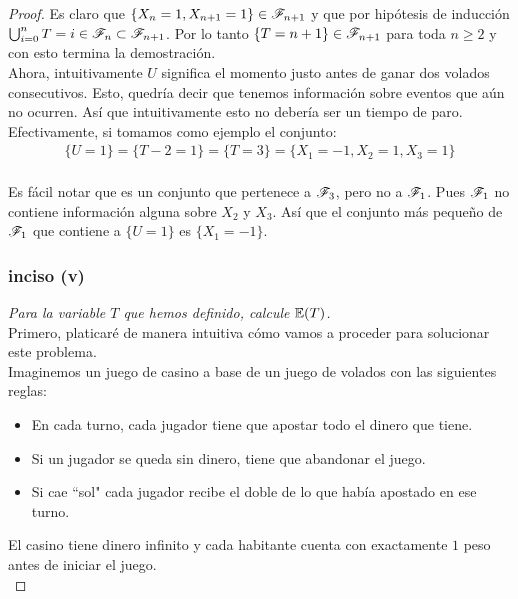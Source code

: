 \begin{proof}
			Es claro que $\{ X_n = 1, X_{n+1} = 1\} \in \mathscr{F}_{n + 1}$ y que por hipótesis de inducción
			$\bigcup_{i=0}^{n} {T = i} \in \mathscr{F}_n \subset \mathscr{F}_{n + 1}$. Por lo tanto
			$\{T = n + 1 \} \in \mathscr{F}_{n+1}$ para toda $n \geq 2$ y con esto termina la demostración.\\
			
		Ahora, intuitivamente $U$ significa el momento justo antes de ganar dos volados consecutivos.
		Esto, quedría decir que tenemos información sobre eventos que aún no ocurren. Así que intuitivamente
		esto no debería ser un tiempo de paro.\\
		
		Efectivamente, si tomamos como ejemplo el conjunto: 
			\begin{align}
				\{ U = 1 \} = \{ T - 2 = 1\} = \{ T = 3\} = \{X_1 = -1, X_2 = 1, X_3 = 1\}
			\end{align}		\\
				
		Es fácil notar que es un conjunto que pertenece a $\mathscr{F}_3$, pero no a $\mathscr{F}_1$. Pues $\mathscr{F}_1$
		no contiene información alguna sobre $X_2$ y $X_3$. Así que el conjunto más pequeño de $\mathscr{F}_1$ 
		que contiene a $\{ U = 1 \}$ es $\{ X_1 = -1 \}$.\\
	
	\subsubsection{inciso (v)}	
	\emph
	{
		Para la variable $T$ que hemos definido, calcule $\mathbb{E}\! \left( T \right)$.\\
	}
		Primero, platicaré de manera intuitiva cómo vamos a proceder para solucionar este problema.\\
	
		Imaginemos un juego de casino a base de un juego de volados con las siguientes reglas:\\
		\begin{itemize}
				\item En cada turno, cada jugador tiene que apostar todo el dinero que tiene.
				\item Si un jugador se queda sin dinero, tiene que abandonar el juego.
				\item Si cae ``sol" cada jugador recibe el doble de lo que había apostado en ese turno.  
		\end{itemize}
	   
		\;El casino tiene dinero infinito y cada habitante cuenta con exactamente $1$ peso antes de
		iniciar el juego.\\
	   

\end{proof}
